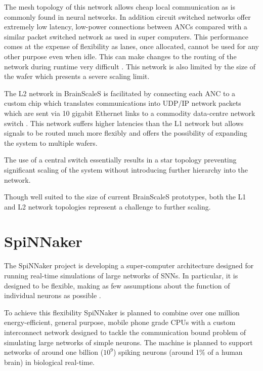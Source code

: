 				The mesh topology of this network allows cheap local communication as is
				commonly found in neural networks.  In addition circuit switched
				networks offer extremely low latency, low-power connections between ANCs
				compared with a similar packet switched network as used in super
				computers. This performance comes at the expense of flexibility as
				lanes, once allocated, cannot be used for any other purpose even when
				idle. This can make changes to the routing of the network during runtime
				very difficult \cite{dally04}. This network is also limited by the size
				of the wafer which presents a severe scaling limit.
				
				The L2 network in BrainScaleS is facilitated by connecting each ANC to a
				custom chip which translates communications into UDP/IP network packets
				which are sent via 10 gigabit Ethernet links to a commodity data-centre
				network switch \cite{schemmel10}. This network suffers higher latencies
				than the L1 network but allows signals to be routed much more flexibly
				and offers the possibility of expanding the system to multiple wafers.
				
				The use of a central switch essentially results in a star topology
				preventing significant scaling of the system without introducing further
				hierarchy into the network.
				
				Though well suited to the size of current BrainScaleS prototypes, both
				the L1 and L2 network topologies represent a challenge to further
				scaling.
	
	\section{SpiNNaker}
		
		\label{sec:spinnaker}
		
		The SpiNNaker project is developing a super-computer architecture designed
		for running real-time simulations of large networks of SNNs. In particular,
		it is designed to be flexible, making as few assumptions about the function
		of individual neurons as possible \cite{furber06}.
		
		To achieve this flexibility SpiNNaker is planned to combine over one million
		energy-efficient, general purpose, mobile phone grade CPUs with a custom
		interconnect network designed to tackle the communication bound problem of
		simulating large networks of simple neurons. The machine is planned to
		support networks of around one billion ($10^9$) spiking neurons (around 1\%
		of a human brain) in biological real-time.
		

